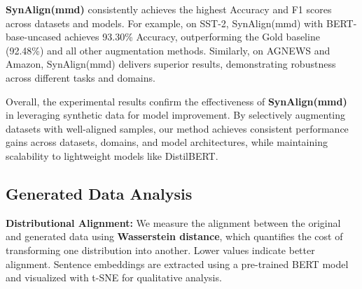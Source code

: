 \textbf{SynAlign(mmd)} consistently achieves the highest Accuracy and F1 scores across datasets and models. For example, on SST-2, SynAlign(mmd) with BERT-base-uncased achieves 93.30\% Accuracy, outperforming the Gold baseline (92.48\%) and all other augmentation methods. Similarly, on AGNEWS and Amazon, SynAlign(mmd) delivers superior results, demonstrating robustness across different tasks and domains.

Overall, the experimental results confirm the effectiveness of \textbf{SynAlign(mmd)} in leveraging synthetic data for model improvement. By selectively augmenting datasets with well-aligned samples, our method achieves consistent performance gains across datasets, domains, and model architectures, while maintaining scalability to lightweight models like DistilBERT.





\subsection{Generated Data Analysis}
\label{exp:datamismatch}




\noindent \textbf{Distributional Alignment:}  
We measure the alignment between the original and generated data using \textbf{Wasserstein distance}, which quantifies the cost of transforming one distribution into another. Lower values indicate better alignment. Sentence embeddings are extracted using a pre-trained BERT model and visualized with t-SNE for qualitative analysis.

